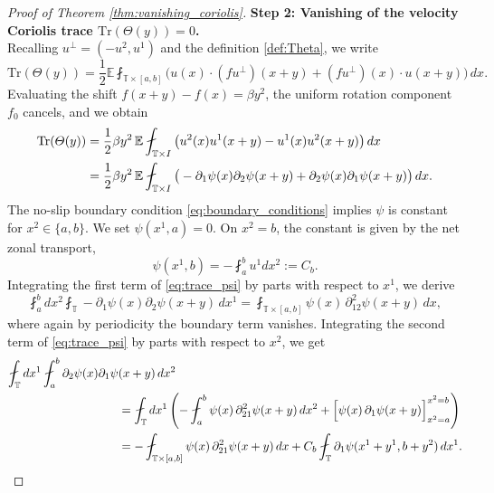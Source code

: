 \documentclass[10pt,a4paper]{amsart}
\begin{document}
\begin{proof}[Proof of Theorem \ref{thm:vanishing_coriolis}]
\noindent \textbf{Step 2: Vanishing of the velocity Coriolis trace $\text{Tr}(\varTheta(y))=0$.}\\
Recalling $u^\perp = (-u^2, u^1)$ and the definition \eqref{def:Theta}, we write
\begin{equation}
    \text{Tr}(\varTheta(y)) = \frac{1}{2}\mathbb{E} \fint_{\mathbb{T}\times [a,b]} \big(u(x) \cdot (fu^\perp)(x+y) + (f u^\perp)(x) \cdot u(x+y)\big)\, dx.
\end{equation}
Evaluating the shift $f(x+y) - f(x) = \beta y^2$, the uniform rotation component $f_0$ cancels, and we obtain
\begin{align}
    \text{Tr}(\varTheta(y)) &= \frac{1}{2}\beta y^2 \, \mathbb{E} \fint_{\mathbb{T} \times I} \big( u^2(x)u^1(x+y) - u^1(x)u^2(x+y) \big) \, dx\notag \\
    &= \frac{1}{2}\beta y^2 \, \mathbb{E} \fint_{\mathbb{T} \times I} \big( -\partial_1 \psi(x) \partial_2 \psi(x+y) + \partial_2 \psi(x) \partial_1 \psi(x+y) \big) \, dx.\label{eq:trace_psi}
\end{align}
The no-slip boundary condition \eqref{eq:boundary_conditions} implies $\psi$ is constant for $x^2\in \{a,b\}$. We set $\psi(x^1, a) = 0$. On $x^2=b$, the constant is given by the net zonal transport,
\begin{equation}
    \psi(x^1, b) = - \fint_a^b u^1 dx^2 := C_b.
\end{equation}
Integrating the first term of \eqref{eq:trace_psi} by parts with respect to $x^1$, we derive
\begin{equation}\label{eq:int1}
    \fint_a^b dx^2 \fint_{\mathbb{T}} -\partial_1 \psi (x)\partial_2 \psi(x+y) \, dx^1 = \fint_{\mathbb{T} \times [a, b]} \psi(x) \, \partial_{12}^2 \psi(x+y) \, dx,
\end{equation}
where again by periodicity the boundary term vanishes. Integrating the second term of \eqref{eq:trace_psi} by parts with respect to $x^2$, we get
\begin{align}
    \fint_{\mathbb{T}} dx^1 \fint_a^b \partial_2 \psi(x) \partial_1\psi&(x+y) \, dx^2 \label{eq:int2}\\
    &= \fint_{\mathbb{T}} dx^1 \left( - \fint_a^b \psi(x) \, \partial_{21}^2 \psi(x+y) \, dx^2 + \Big[ \psi(x) \, \partial_1 \psi(x+y) \Big]_{x^2=a}^{x^2=b} \right)\notag \\
    &= - \fint_{\mathbb{T} \times [a, b]} \psi(x) \, \partial_{21}^2 \psi(x+y) \, dx + C_b \fint_{\mathbb{T}} \partial_1 \psi(x^1+y^1, b+y^2) \, dx^1.\notag
\end{align}

\end{proof}
\end{document}
